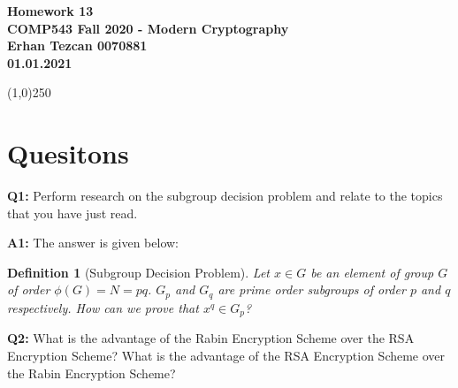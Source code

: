\documentclass[12pt,reqno]{amsart}
\newcommand{\code}[1]{\texttt{#1}}
\newtheorem{definition}[theorem]{Definition}
\begin{document}
\begin{center}
\large\textbf{Homework 13 \\ COMP543 Fall 2020 - Modern Cryptography \\}
\normalsize\textbf{ Erhan Tezcan 0070881 \\ 01.01.2021} \\
\end{center}

\begin{center}
\line(1,0){250}
\end{center}

%
%

%
%

\section{Quesitons}
\textbf{Q1:} Perform research on the subgroup decision problem and relate to the topics that you have just read.

\textbf{A1:} The answer is given below:
\begin{definition}[Subgroup Decision Problem]
Let $x \in G$ be an element of group $G$ of order $\phi(G)=N=pq$. $G_p$ and $G_q$ are prime order subgroups of order $p$ and $q$ respectively. How can we prove that $x^q \in G_p$?
\end{definition}

\vspace{20px}
\textbf{Q2:} What is the advantage of the Rabin Encryption Scheme over the RSA Encryption Scheme? What is the advantage of the RSA Encryption Scheme over the Rabin Encryption Scheme?
\end{document}

